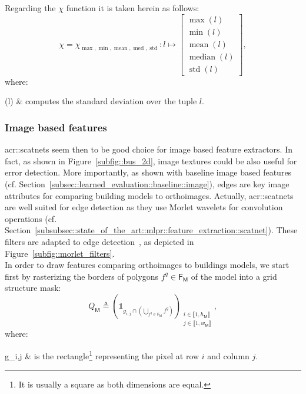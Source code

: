             Regarding the \(\chi\) function it is taken herein as follows:
            \begin{equation}
                \label{eq::max_min_mean_med_std_extractor}
                \chi = \chi_{\max,\min,\operatorname{mean},\operatorname{med},\operatorname{std}}: l \mapsto \begin{bmatrix}
                    \max(l)\\
                    \min(l)\\
                    \operatorname{mean}(l)\\
                    \operatorname{median}(l)\\
                    \operatorname{std}(l)
                \end{bmatrix},
            \end{equation}
            where:
            \begin{conditions}
                (l) & computes the standard deviation over the tuple \(l\).
            \end{conditions}

        \subsubsection{Image based features}
            \glspl{acr::scatnet} seem then to be good choice for image based feature extractors.
            In fact, as shown in Figure~\ref{subfig::bus_2d}, image textures could be also useful for error detection.
            More importantly, as shown with baseline image based features (cf. Section~\ref{subsec::learned_evaluation::baseline::image}), edges are key image attributes for comparing building models to orthoimages.
            Actually, \glspl{acr::scatnet} are well suited for edge detection as they use Morlet wavelets for convolution operations (cf. Section~\ref{subsubsec::state_of_the_art::mlpr::feature_extraction::scatnet}).
            These filters are adapted to edge detection~\parencite{zhang2007radon}, as depicted in Figure~\ref{subfig::morlet_filters}.\\

            In order to draw features comparing orthoimages to buildings models, we start first by rasterizing the borders of polygons \(f^q \in \mathsf{F_M}\) of the model into a grid structure mask:
            \begin{equation}
                \label{eq::borders_mask}
                Q_{\mathsf{M}} \triangleq \left(\mathbb{1}_{g_{i,j} \cap \left(\bigcup_{f^q \in \mathsf{F_M}}f^q\right)}\right)_{\substack{i \in \llbracket 1, h_\mathsf{M} \rrbracket\\j \in \llbracket 1, w_\mathsf{M} \rrbracket}},
            \end{equation}
            where:
            \begin{conditions}
                g_{i,j} & is the rectangle\footnote{It is usually a square as both dimensions are equal.} representing the pixel at row \(i\) and column \(j\).
            \end{conditions}

